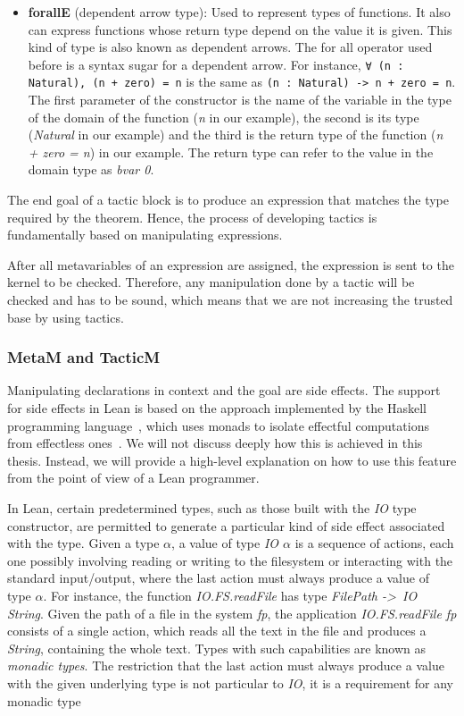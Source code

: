 \begin{itemize}
  \item \textbf{forallE} (dependent arrow type): Used to represent types of functions. It also can express functions whose return type depend on the value it is given. This kind of type is also known as dependent arrows. The for all operator used before is a syntax sugar for a dependent arrow. For instance, \texttt{∀ (n : Natural), (n + zero) = n} is the same as \texttt{(n : Natural) -> n + zero = n}. The first parameter of the constructor is the name of the variable in the type of the domain of the function (\textit{n} in our example), the second is its type (\textit{Natural} in our example) and the third is the return type of the function (\textit{n + zero = n}) in our example. The return type can refer to the value in the domain type as \textit{bvar 0}.
\end{itemize}

The end goal of a tactic block is to produce an expression that matches the type required by the theorem. Hence, the process of developing tactics is fundamentally based on manipulating expressions.

After all metavariables of an expression are assigned, the expression is sent to the kernel to be checked. Therefore, any manipulation done by a tactic will be checked and has to be sound, which means that we are not increasing the trusted base by using tactics.

\subsubsection{MetaM and TacticM}

Manipulating declarations in context and the goal are side effects. The support for side effects in Lean is based on the approach implemented by the Haskell programming language~\cite{haskell}, which uses monads to isolate effectful computations from effectless ones~\cite{imperativeFunctional}. We will not discuss deeply how this is achieved in this thesis. Instead, we will provide a high-level explanation on how to use this feature from the point of view of a Lean programmer.

In Lean, certain predetermined types, such as those built with the \textit{IO} type constructor, are permitted to generate a particular kind of side effect associated with the type.
Given a type \textit{$\alpha$}, a value of type \textit{IO $\alpha$} is a sequence of actions, each one possibly involving reading or writing to the
filesystem or interacting with the standard input/output, where the last action must always produce a value of type \textit{$\alpha$}. For instance,
the function \textit{IO.FS.readFile} has type \textit{FilePath -\textgreater\ IO String}. Given the path of a file in the system \textit{fp}, the application \textit{IO.FS.readFile fp} consists of a single action, which reads all the text in the file and produces a \textit{String}, containing the whole text. Types with such capabilities are known as \textit{monadic types}. The restriction that the last action must always produce a value with the given underlying type is not particular to \textit{IO}, it is a requirement for any monadic type

